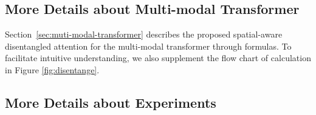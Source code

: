 \documentclass[11pt]{article}
\begin{document}
\subsection{More Details about Multi-modal Transformer}
\label{sec:detail_disentangle}
Section~\ref{sec:muti-modal-transformer} describes the proposed spatial-aware disentangled attention for the multi-modal transformer through formulas.
To facilitate intuitive understanding, we also supplement the flow chart of calculation in Figure \ref{fig:disentange}.


\begin{table*}[t]
\centering
\small
{}
\caption{Results of ERNIE-Layout (base-level model) and previous methods on various downstream VrDU tasks.  marks the results without any description of fine-tuning set (train or train+dev), The bold and underlined scores indicate the best and second results, respectively.}
\label{tab:base_results}
\end{table*}


\subsection{More Details about Experiments}
\label{sec:detail_finetuning_datasets}
\end{document}
